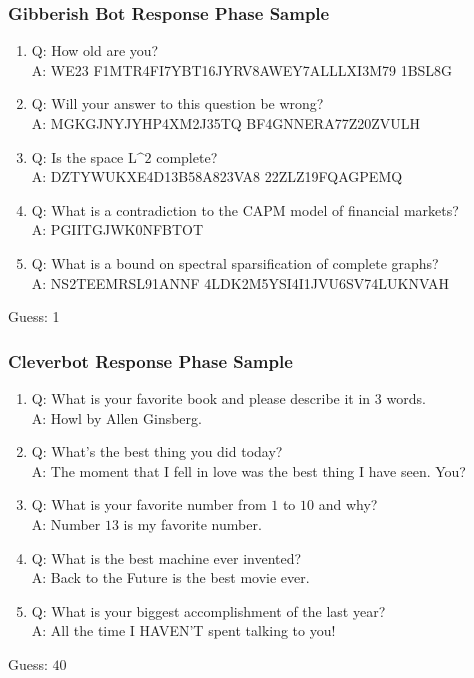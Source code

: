 \subsubsection{Gibberish Bot Response Phase Sample}
\begin{enumerate}
\item Q: How old are you?
\\A: WE23 F1MTR4FI7YBT16JYRV8AWEY7ALLLXI3M79 1BSL8G

\item Q: Will your answer to this question be wrong?
\\A: MGKGJNYJYHP4XM2J35TQ BF4GNNERA77Z20ZVULH

\item Q: Is the space L$\^2$ complete?
\\A: DZTYWUKXE4D13B58A823VA8 22ZLZ19FQAGPEMQ

\item Q: What is a contradiction to the CAPM model of financial markets?
\\A: PGIITGJWK0NFBTOT

\item Q: What is a bound on spectral sparsification of complete graphs?
\\A: NS2TEEMRSL91ANNF 4LDK2M5YSI4I1JVU6SV74LUKNVAH
\end{enumerate}
Guess: 1

\subsubsection{Cleverbot Response Phase Sample}
\begin{enumerate}
\item Q: What is your favorite book and please describe it in $3$ words.
\\A: Howl by Allen Ginsberg.

\item Q: What's the best thing you did today?
\\A: The moment that I fell in love was the best thing I have seen. You?

\item Q: What is your favorite number from $1$ to $10$ and why?
\\A: Number $13$ is my favorite number.

\item Q: What is the best machine ever invented?
\\A: Back to the Future is the best movie ever.

\item Q: What is your biggest accomplishment of the last year?
\\A: All the time I HAVEN'T spent talking to you!
\end{enumerate}
Guess: $40$

